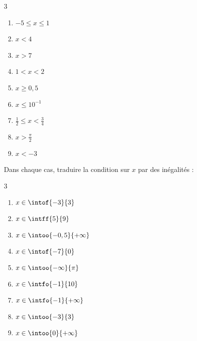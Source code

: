 \vspace{-6pt}
\setlength{\columnsep}{1cm}
\setlength{\columnseprule}{0pt}
\begin{multicols}{3}
\begin{enumerate}
\item $-5\leqslant x\leqslant 1$

\medskip
\item $x<4$

\medskip
\item $x>7$

\medskip
\item $1<x<2$

\medskip
\item $x\geqslant 0,5$

\medskip
\item $x\leqslant 10^{-1}$

\medskip
\item $\frac{1}{2}\leqslant x< \frac{3}{4}$

\medskip
\item $x>\frac{\pi}{2}$

\medskip
\item $x<-3$
\end{enumerate}
\end{multicols}

\exo

Dans chaque cas, traduire la condition sur $x$ par des inégalités :

\vspace{-6pt}
\setlength{\columnsep}{1cm}
\setlength{\columnseprule}{0pt}
\begin{multicols}{3}
\begin{enumerate}
\item $x\in\intof{-3}{3}$

\medskip
\item $x\in\intff{5}{9}$

\medskip
\item $x\in\intoo{-0,5}{+\infty}$

\medskip
\item $x\in\intof{-7}{0}$

\medskip
\item $x\in\intoo{-\infty}{\pi}$

\medskip
\item $x\in\intfo{-1}{10}$

\medskip
\item $x\in\intfo{-1}{+\infty}$

\medskip
\item $x\in\intoo{-3}{3}$

\medskip
\item $x\in\intoo{0}{+\infty}$
\end{enumerate}
\end{multicols}


